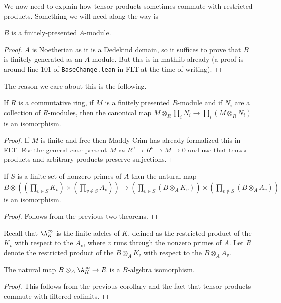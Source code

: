 We now need to explain how tensor products sometimes commute with restricted products.
Something we will need along the way is

\begin{theorem} $B$ is a finitely-presented $A$-module.
  \label{IsDedekindDomain.AKLB.finitePresentation}
\end{theorem}
\begin{proof} $A$ is Noetherian as it is a Dedekind domain, so it suffices to prove that $B$ is
  finitely-generated as an $A$-module. But this is in mathlib already (a proof is
  around line 101 of {\tt BaseChange.lean} in FLT at the time of writing).
\end{proof}

The reason we care about this is the following.

\begin{theorem}
  \label{pi_tensorProduct_of_finitePresentation}
  If $R$ is a commutative ring, if $M$ is a finitely presented $R$-module
  and if $N_i$ are a collection of $R$-modules, then the canonical map
  $M\otimes_R\prod_i N_i\to\prod_i(M\otimes_R N_i)$ is an isomorphism.
\end{theorem}
\begin{proof} If $M$ is finite and free then Maddy Crim has already formalized this
  in FLT. For the general case present $M$ as $R^a\to R^b\to M\to 0$ and use that tensor
  products and arbitrary products preserve surjections.
\end{proof}

\begin{corollary}
  \label{IsDedekindDomain.pi_tensorProduct}
  If $S$ is a finite set of nonzero primes of $A$ then the natural map
  $B\otimes((\prod_{v\in S}K_v)\times(\prod_{v\notin S}A_v))\to
  (\prod_{v\in S}(B\otimes_AK_v))\times(\prod_{v\notin S}(B\otimes_AA_v))$
  is an isomorphism.
\end{corollary}
\begin{proof} Follows from the previous two theorems.
\end{proof}

Recall that $\A_K^\infty$ is the finite adeles of $K$,
defined as the restricted product of the $K_v$ with respect to the $A_v$,
where $v$ runs through the nonzero primes of $A$. Let $R$ denote the restricted
product of the $B\otimes_A K_v$ with respect to the $B\otimes_A A_v$.

\begin{corollary}
  \label{IsDedekindDomain.FiniteAdeleRing.IntegraltensorProductAlgEquiv_aux1}
  The natural map $B\otimes_A\A_K^\infty\to R$ is a $B$-algebra isomorphism.
\end{corollary}
\begin{proof} This follows from the previous corollary and the fact that
  tensor products commute with filtered colimits.
\end{proof}

